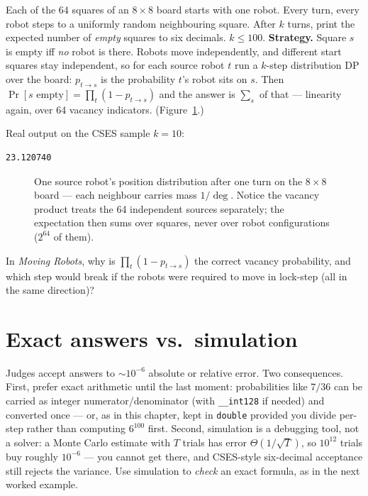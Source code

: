 \begin{example}
Each of the $64$ squares of an $8\times8$ board starts with one
robot. Every turn, every robot steps to a uniformly random
neighbouring square. After $k$ turns, print the expected number
of \emph{empty} squares to six decimals. $k\le 100$.
\textbf{Strategy.} Square $s$ is empty iff \emph{no} robot is
there. Robots move independently, and different start squares
stay independent, so for each source robot $t$ run a $k$-step
distribution DP over the board: $p_{t\to s}$ is the probability
$t$'s robot sits on $s$. Then
$\Pr[s\text{ empty}]=\prod_t(1-p_{t\to s})$ and the answer is
$\sum_s$ of that --- linearity again, over 64 vacancy
indicators. (Figure~\ref{fig:robots}.)
\end{example}
\begin{solution}

Real output on the CSES sample $k=10$:
\begin{verbatim}
23.120740
\end{verbatim}
\end{solution}
\begin{figure}[ht]\centering

\caption{One source robot's position distribution after one
turn on the $8\times8$ board --- each neighbour carries mass
$1/\deg$. Notice the vacancy product treats the 64 independent
sources separately; the expectation then sums over squares,
never over robot configurations ($2^{64}$ of them).}
\label{fig:robots}
\end{figure}

\begin{exercise}[medium] In \emph{Moving Robots}, why is
$\prod_t(1-p_{t\to s})$ the correct vacancy probability, and
which step would break if the robots were required to move in
lock-step (all in the same direction)?\end{exercise}

\section{Exact answers vs.\ simulation}\label{sec:sim}
Judges accept answers to $\sim\!10^{-6}$ absolute or relative
error. Two consequences. First, prefer exact arithmetic until
the last moment: probabilities like $7/36$ can be carried as
integer numerator/denominator (with \texttt{\_\_int128} if
needed) and converted once --- or, as in this chapter, kept in
\texttt{double} provided you divide per-step rather than
computing $6^{100}$ first. Second, simulation is a debugging
tool, not a solver: a Monte Carlo estimate with $T$ trials has
error $\Theta(1/\sqrt{T})$, so $10^{12}$ trials buy roughly
$10^{-6}$ --- you cannot get there, and CSES-style six-decimal
acceptance still rejects the variance. Use simulation to
\emph{check} an exact formula, as in the next worked example.

